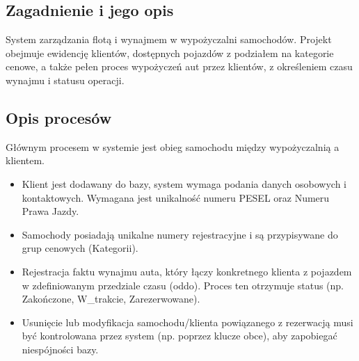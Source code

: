 \documentclass[a4paper,11pt,english,openany,oneside]{sphinxmanual}
\begin{document}
\subsection{Zagadnienie i jego opis}
\label{\detokenize{rozdzial_3/index:zagadnienie-i-jego-opis}}
\sphinxAtStartPar
System zarządzania flotą i wynajmem w wypożyczalni samochodów.
Projekt obejmuje ewidencję klientów, dostępnych pojazdów z podziałem na kategorie cenowe, a także pełen proces wypożyczeń aut przez klientów, z określeniem czasu wynajmu i statusu operacji.


\subsection{Opis procesów}
\label{\detokenize{rozdzial_3/index:opis-procesow}}
\sphinxAtStartPar
Głównym procesem w systemie jest obieg samochodu między wypożyczalnią a klientem.
\begin{itemize}
\item {} 
\sphinxAtStartPar
{} Klient jest dodawany do bazy, system wymaga podania danych osobowych i kontaktowych. Wymagana jest unikalność numeru PESEL oraz Numeru Prawa Jazdy.

\item {} 
\sphinxAtStartPar
{} Samochody posiadają unikalne numery rejestracyjne i są przypisywane do grup cenowych (Kategorii).

\item {} 
\sphinxAtStartPar
{} Rejestracja faktu wynajmu auta, który łączy konkretnego klienta z pojazdem w zdefiniowanym przedziale czasu (od\sphinxhyphen{}do). Proces ten otrzymuje status (np. Zakończone, W\_trakcie, Zarezerwowane).

\item {} 
\sphinxAtStartPar
{} Usunięcie lub modyfikacja samochodu/klienta powiązanego z rezerwacją musi być kontrolowana przez system (np. poprzez klucze obce), aby zapobiegać niespójności bazy.

\end{itemize}
\end{document}
